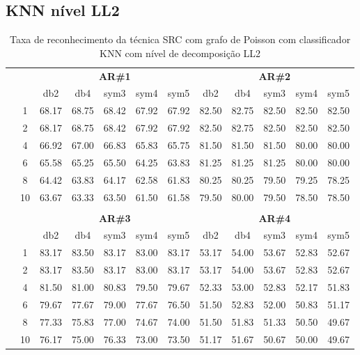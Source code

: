 \subsection{KNN nível LL2}
\begin{table}[htpb]
	\centering
    \normalsize
	\caption{Taxa de reconhecimento da técnica SRC com grafo de Poisson com classificador KNN com nível de decomposição LL2}
	\begin{tabular}{|c|c|c c c c c|c c c c c|}
\cline{3-12}
\multicolumn{2}{c|}{\multirow{2}{*}{}} & \multicolumn{5}{c|}{\textbf{AR\#1}}  & \multicolumn{5}{c|}{\textbf{AR\#2}} \\\cline{3-12}

\multicolumn{2}{c|}{}  & db2 & db4 & sym3 & sym4 & sym5 & db2 & db4& sym3 & sym4 & sym5 \\\hline

\multicolumn{1}{|c|}{ \multirow{5}{*}{\rotatebox[origin=c]{90}{\textbf{K-vizinhos}}} }
&1	&68.17	& 68.75	& 68.42	& 67.92	&67.92 &82.50	& 82.75	&82.50	&82.50	&82.50\\\cline{2-12}
&2	&68.17	& 68.75	& 68.42	& 67.92	&67.92 &82.50	& 82.75	&82.50	&82.50	&82.50\\\cline{2-12}
&4	&66.92	& 67.00	& 66.83	& 65.83	&65.75 &81.50	& 81.50	&81.50	&80.00	&80.00\\\cline{2-12}
&6	&65.58	& 65.25	& 65.50	& 64.25	&63.83 &81.25	& 81.25	&81.25	&80.00	&80.00\\\cline{2-12}
&8	&64.42	& 63.83	& 64.17	& 62.58	&61.83 &80.25	& 80.25	&79.50	&79.25	&78.25\\\cline{2-12}
&10	&63.67	& 63.33	& 63.50	& 61.50	&61.58 &79.50	& 80.00	&79.50	&78.50	&78.50

\\ \midrule
\multicolumn{12}{c}{}\\ 




\cline{3-12}
\multicolumn{2}{c}{} & \multicolumn{5}{|c|}{\textbf{AR\#3}}  & \multicolumn{5}{c|}{\textbf{AR\#4}} \\\cline{3-12}
\multicolumn{2}{c}{}  & \multicolumn{1}{|c}{db2} & db4 & sym3 & sym4 & sym5 & db2 & db4& sym3 & sym4 & sym5 \\\hline
\multicolumn{1}{|c|}{ \multirow{6}{*}{\rotatebox[origin=c]{90}{\textbf{K-vizinhos}}} }
&1	&83.17	&83.50	&83.17	&83.00	&83.17	&53.17	&54.00	&53.67	&52.83	&52.67\\\cline{2-12}
&2	&83.17	&83.50	&83.17	&83.00	&83.17	&53.17	&54.00	&53.67	&52.83	&52.67\\\cline{2-12}
&4	&81.50	&81.00	&80.83	&79.50	&79.67	&52.33	&53.00	&52.83	&52.17	&51.83\\\cline{2-12}
&6	&79.67	&77.67	&79.00	&77.67	&76.50	&51.50	&52.83	&52.00	&50.83	&51.17\\\cline{2-12}
&8	&77.33	&75.83	&77.00	&74.67	&74.00	&51.50	&51.83	&51.33	&50.50	&49.67\\\cline{2-12}
&10	&76.17	&75.00	&76.33	&73.00	&73.50	&51.17	&51.67	&50.67	&50.00	&49.67 %
	

\end{tabular}
\end{table}
